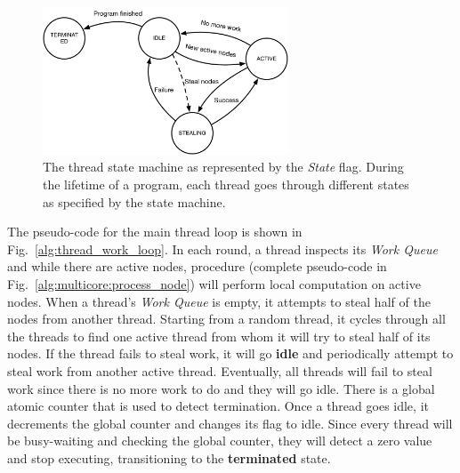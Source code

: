 \begin{figure}[ht]
   \centering
   \includegraphics[width=0.65\textwidth]{figures/implementation/thread_states.pdf}
   \caption{The thread state machine as represented by the \emph{State} flag. During
      the lifetime of a program, each thread goes through different states as
      specified by the state machine.}
   \label{fig:implementation:thread_states}
\end{figure}

The pseudo-code for the main thread loop is shown in
Fig.~\ref{alg:thread_work_loop}. In each round, a thread inspects its \emph{Work
Queue} and while there are active nodes, procedure 
(complete pseudo-code in Fig.~\ref{alg:multicore:process_node}) will perform
local computation on active nodes. When a thread's \emph{Work Queue} is empty,
it attempts to steal half of the nodes from another thread. Starting from a
random thread, it cycles through all the threads to find one active thread from
whom it will try to steal half of its nodes. If the thread fails to steal work,
it will go \textbf{idle} and periodically attempt to steal work from another
active thread. Eventually, all threads will fail to steal work since there is no
more work to do and they will go idle.  There is a global atomic counter that is
used to detect termination. Once a thread goes idle, it decrements the global
counter and changes its flag to idle.  Since every thread will be busy-waiting
and checking the global counter, they will detect a zero value and stop
executing, transitioning to the \textbf{terminated} state.

